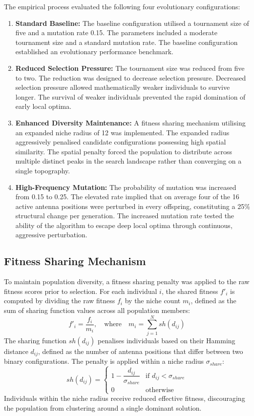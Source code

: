 \documentclass[conference]{IEEEtran}
\begin{document}
The empirical process evaluated the following four evolutionary configurations:
\begin{enumerate}
    \item \textbf{Standard Baseline:} The baseline configuration utilised a tournament size of five and a mutation rate 0.15.
     The parameters included a moderate tournament size and a standard mutation rate. The baseline configuration established an evolutionary performance benchmark.
    \item \textbf{Reduced Selection Pressure:} The tournament size was reduced from five to two. The reduction was designed to decrease selection pressure. Decreased selection pressure allowed mathematically weaker individuals to survive longer. The survival of weaker individuals prevented the rapid domination of early local optima.
    \item \textbf{Enhanced Diversity Maintenance:} A fitness sharing mechanism utilising an expanded niche radius of 12 was 
    implemented. The expanded radius aggressively penalised candidate configurations possessing high spatial similarity. The spatial penalty forced the population to distribute across multiple distinct peaks in the search landscape rather than converging on a single topography.
    \item \textbf{High-Frequency Mutation:} The probability of mutation was increased 
    from 0.15 to 0.25. The elevated rate implied that on average four of the 16 active 
    antenna positions were perturbed in every offspring, constituting a 25\% structural 
    change per generation. The increased mutation rate tested the ability of the 
    algorithm to escape deep local optima through continuous, aggressive perturbation.
\end{enumerate}

\subsection{Fitness Sharing Mechanism}
To maintain population diversity, a fitness sharing penalty was applied to the raw fitness 
scores prior to selection. For each individual $i$, the shared fitness $f'_i$ is computed 
by dividing the raw fitness $f_i$ by the niche count $m_i$, defined as the sum of sharing 
function values across all population members:
\begin{equation}
f'_i = \frac{f_i}{m_i}, \quad \text{where} \quad m_i = \sum_{j=1}^{N} sh(d_{ij})
\end{equation}
The sharing function $sh(d_{ij})$ penalises individuals based on their Hamming distance 
$d_{ij}$, defined as the number of antenna positions that differ between two binary 
configurations. The penalty is applied within a niche radius $\sigma_{share}$:
\begin{equation}
sh(d_{ij}) = \begin{cases} 1 - \dfrac{d_{ij}}{\sigma_{share}} & \text{if } d_{ij} < \sigma_{share} \\ 0 & \text{otherwise} \end{cases}
\end{equation}
Individuals within the niche radius receive reduced effective fitness, discouraging the 
population from clustering around a single dominant solution.
\end{document}
